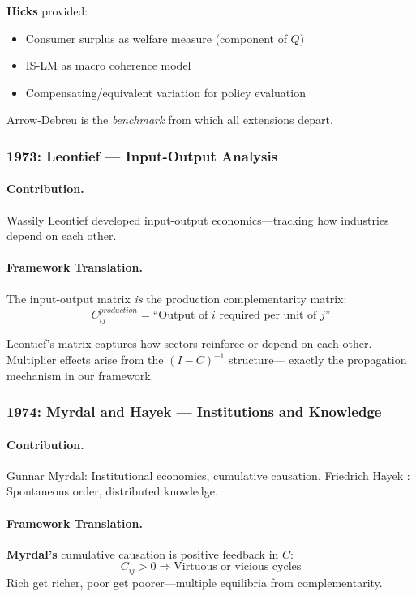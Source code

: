 \documentclass[12pt,a4paper]{article}
\begin{document}
\textbf{Hicks} provided:
\begin{itemize}
  \item Consumer surplus as welfare measure (component of $Q$)
  \item IS-LM as macro coherence model
  \item Compensating/equivalent variation for policy evaluation
\end{itemize}

Arrow-Debreu is the \emph{benchmark} from which all extensions depart.

\subsubsection{1973: Leontief --- Input-Output Analysis}

\paragraph{Contribution.}
Wassily Leontief developed input-output economics---tracking how
industries depend on each other.

\paragraph{Framework Translation.}
The input-output matrix \emph{is} the production complementarity matrix:
\begin{equation}
  C^{production}_{ij} = \text{``Output of } i \text{ required per unit of } j\text{''}
\end{equation}

Leontief's matrix captures how sectors reinforce or depend on each other.
Multiplier effects arise from the $(I - C)^{-1}$ structure---
exactly the propagation mechanism in our framework.

\subsubsection{1974: Myrdal and Hayek --- Institutions and Knowledge}

\paragraph{Contribution.}
Gunnar Myrdal: Institutional economics, cumulative causation.
Friedrich Hayek \citep{hayek1945}: Spontaneous order, distributed knowledge.

\paragraph{Framework Translation.}
\textbf{Myrdal's} cumulative causation is positive feedback in $C$:
\begin{equation}
  C_{ij} > 0 \Rightarrow \text{Virtuous or vicious cycles}
\end{equation}
Rich get richer, poor get poorer---multiple equilibria from complementarity.
\end{document}
